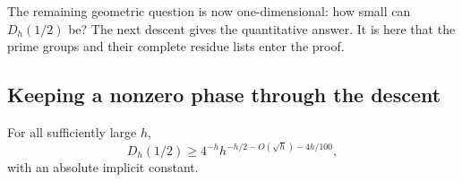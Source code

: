 The remaining geometric question is now one-dimensional: how small can
$D_h(1/2)$ be? The next descent gives the quantitative answer. It is here
that the prime groups and their complete residue lists enter the proof.

\subsection{Keeping a nonzero phase through the descent}
\begin{lemma}\label{mask:reset}
For all sufficiently large $h$,
\begin{equation}\label{mask:reset-bound}
 D_h(1/2)\geq4^{-h}h^{-h/2-O(\sqrt h)-4h/100},
\end{equation}
with an absolute implicit constant.
\end{lemma}
